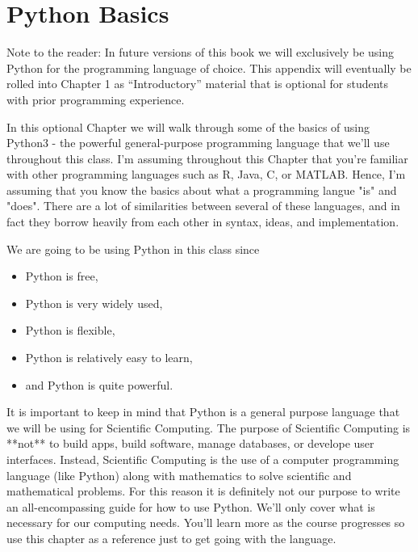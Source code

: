 \chapter{Python Basics}\label{app:Python}

Note to the reader: In future versions of this book we will exclusively be using Python
for the programming language of choice.  This appendix will eventually be rolled into
Chapter 1 as ``Introductory'' material that is optional for students with prior
programming experience.

In this optional Chapter we will walk through some of the basics of using Python3 - the powerful general-purpose programming language that we'll use throughout this class.  I'm assuming throughout this Chapter that you're familiar with other programming languages such as R, Java, C, or MATLAB.  Hence, I'm assuming that you know the basics about what a programming langue "is" and "does".  There are a lot of similarities between several of these languages, and in fact they borrow heavily from each other in syntax, ideas, and implementation.

We are going to be using Python in this class since

\begin{itemize}
    \item Python is free,
    \item Python is very widely used,
    \item Python is flexible,
    \item Python is relatively easy to learn,
    \item and Python is quite powerful.
\end{itemize}

It is important to keep in mind that Python is a general purpose language that we will be using for Scientific Computing.  The purpose of Scientific Computing is **not** to build apps, build software, manage databases, or develope user interfaces.  Instead, Scientific Computing is the use of a computer programming language (like Python) along with mathematics to solve scientific and mathematical problems.  For this reason it is definitely not our purpose to write an all-encompassing guide for how to use Python.  We'll only cover what is necessary for our computing needs.  You'll learn more as the course progresses so use this chapter as a reference just to get going with the language.

